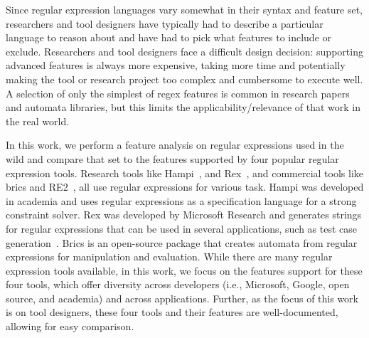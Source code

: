 Since  regular expression languages vary somewhat in their syntax and feature set, researchers and tool designers have typically had to describe a particular language to reason about and have had to pick what features to include or exclude. Researchers and tool designers face a difficult design decision: supporting advanced features is always more expensive, taking more time and potentially making the tool or research project too complex and cumbersome to execute well.  A selection of only the simplest of regex features is common in research papers and automata libraries, but this limits the applicability/relevance of that work in the real world.



In this work, we perform a feature analysis on regular expressions used in the wild and compare that set to the features supported by four popular regular expression tools.
Research tools like Hampi~\cite{hampi}, and Rex~\cite{rex}, and commercial tools like brics\cite{brics} and RE2~\cite{re2}, all use regular expressions for various task. Hampi was developed  in academia and uses regular expressions as a specification language for a strong constraint solver. Rex was developed by Microsoft Research and generates strings for regular expressions that can be used in several applications, such as test case generation~\cite{}. Brics is an open-source package that creates automata from regular expressions for manipulation and evaluation.
While there are many regular expression tools available, in this work, we focus on the features support for these four tools, which offer diversity across developers (i.e., Microsoft, Google, open source, and academia) and across applications. Further, as the focus of this work is on tool designers, these four tools and their features are well-documented, allowing for easy comparison.




